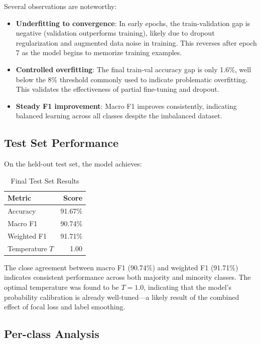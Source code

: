 \documentclass[conference, 10pt]{IEEEtran}
\begin{document}
Several observations are noteworthy:

\begin{itemize}[noitemsep]
    \item \textbf{Underfitting to convergence}: In early epochs, the train-validation gap is negative (validation outperforms training), likely due to dropout regularization and augmented data noise in training. This reverses after epoch 7 as the model begins to memorize training examples.
    \item \textbf{Controlled overfitting}: The final train-val accuracy gap is only 1.6\%, well below the 8\% threshold commonly used to indicate problematic overfitting. This validates the effectiveness of partial fine-tuning and dropout.
    \item \textbf{Steady F1 improvement}: Macro F1 improves consistently, indicating balanced learning across all classes despite the imbalanced dataset.
\end{itemize}

\subsection{Test Set Performance}

On the held-out test set, the model achieves:

\begin{table}[H]
    \centering
    \caption{Final Test Set Results}
    \label{tab:test}
    \begin{tabular}{lr}
        \toprule
        \textbf{Metric} & \textbf{Score} \\
        \midrule
        Accuracy        & 91.67\% \\
        Macro F1        & 90.74\% \\
        Weighted F1     & 91.71\% \\
        Temperature $T$ & 1.00 \\
        \bottomrule
    \end{tabular}
\end{table}

The close agreement between macro F1 (90.74\%) and weighted F1 (91.71\%) indicates consistent performance across both majority and minority classes. The optimal temperature was found to be $T = 1.0$, indicating that the model's probability calibration is already well-tuned—a likely result of the combined effect of focal loss and label smoothing.

\subsection{Per-class Analysis}
\end{document}
